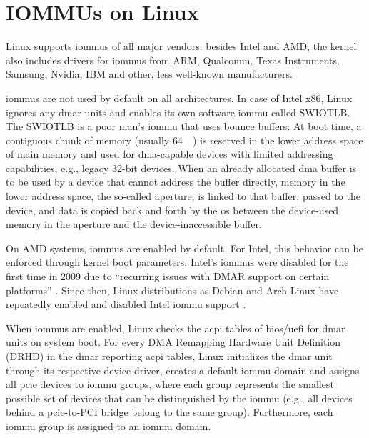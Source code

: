 \section{IOMMUs on Linux}
\label{sec:iommus_on_linux}

Linux supports \acp{iommu} of all major vendors: besides Intel and AMD, the
kernel also includes drivers for \acp{iommu} from ARM, Qualcomm, Texas
Instruments, Samsung, Nvidia, IBM and other, less well-known manufacturers.

\acp{iommu} are not used by default on all architectures. In case of Intel x86,
Linux ignores any \ac{dmar} units and enables its own software \ac{iommu} called
SWIOTLB. The SWIOTLB is a poor man's \ac{iommu} that uses bounce buffers: At
boot time, a contiguous chunk of memory (usually \SI{64}{\mebi\byte}) is
reserved in the lower address space of main memory and used for \ac{dma}-capable
devices with limited addressing capabilities, e.g., legacy 32-bit devices. When
an already allocated \ac{dma} buffer is to be used by a device that cannot
address the buffer directly, memory in the lower address space, the so-called
aperture, is linked to that buffer, passed to the device, and data is copied
back and forth by the \ac{os} between the device-used memory in the aperture and
the device-inaccessible buffer.

On AMD systems, \acp{iommu} are enabled by default. For Intel, this behavior can
be enforced through kernel boot parameters. Intel's \acp{iommu} were disabled
for the first time in 2009 due to ``recurring issues with DMAR support on
certain platforms'' \cite{mcmartin2009disable}. Since then, Linux distributions
as Debian and Arch Linux have repeatedly enabled and disabled Intel \ac{iommu}
support \cite{heftig2020disable, hutchings2009enable}.

When \acp{iommu} are enabled, Linux checks the \acs{acpi} tables of
\ac{bios}/\ac{uefi} for \ac{dmar} units on system boot. For every DMA Remapping
Hardware Unit Definition (DRHD) in the \ac{dmar} reporting \ac{acpi} tables,
Linux initializes the \ac{dmar} unit through its respective device driver,
creates a default \ac{iommu} domain and assigns all \ac{pcie} devices to
\ac{iommu} groups, where each group represents the smallest possible set of
devices that can be distinguished by the \ac{iommu} (e.g., all devices behind a
\ac{pcie}-to-PCI bridge belong to the same group).  Furthermore, each \ac{iommu}
group is assigned to an \ac{iommu} domain.

